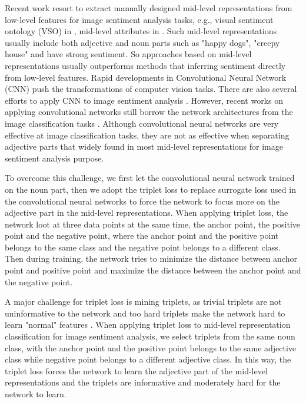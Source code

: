 Recent work resort to extract manually designed mid-level representations from low-level features for image sentiment analysis tasks, e.g., visual sentiment ontology (VSO) in \cite{borth2013large}, mid-level attributes in \cite{yuan2013sentribute}. Such mid-level representations usually include both adjective and noun parts such as "happy dogs", "creepy house" and have strong sentiment. So approaches based on mid-level representations usually outperforms methods that inferring sentiment directly from low-level features. Rapid developments in Convolutional Neural Network (CNN) \cite{krizhevsky2012imagenet, szegedy2015going, simonyan2014very, he2016deep} push the transformations of computer vision tasks. There are also several efforts to apply CNN to image sentiment analysis \cite{you2015robust, chen2014deepsentibank, campos2017pixels}. However, recent works on applying convolutional networks still borrow the network architectures from the image classification tasks \cite{you2015robust, chen2014deepsentibank, ahsan2017towards, campos2017pixels}. Although convolutional neural networks are very effective at image classification tasks, they are not as effective when separating adjective parts that widely found in most mid-level representations for image sentiment analysis purpose.

To overcome this challenge, we first let the convolutional neural network trained on the noun part, then we adopt the triplet loss to replace surrogate loss used in the convolutional neural networks to force the network to focus more on the adjective part in the mid-level representations. When applying triplet loss, the network loot at three data points at the same time, the anchor point, the positive point and the negative point, where the anchor point and the positive point belongs to the same class and the negative point belongs to a different class. Then during training, the network tries to minimize the distance between anchor point and positive point and maximize the distance between the anchor point and the negative point.

A major challenge for triplet loss is mining triplets, as trivial triplets are not uninformative to the network and too hard triplets make the network hard to learn "normal" features \cite{hermans2017defense}. When applying triplet loss to mid-level representation classification for image sentiment analysis, we select triplets from the same noun class, with the anchor point and the positive point belongs to the same adjective class while negative point belongs to a different adjective class. In this way, the triplet loss forces the network to learn the adjective part of the mid-level representations and the triplets are informative and moderately hard for the network to learn.
  
